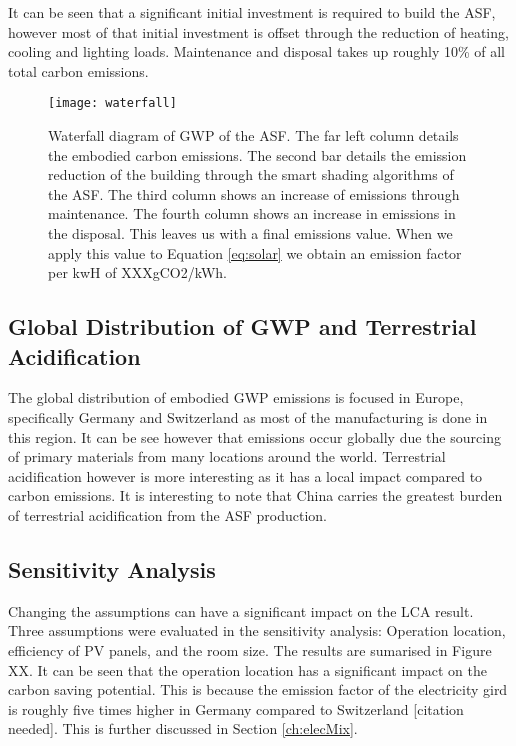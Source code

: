 It can be seen that a significant initial investment is required to build the ASF, however most of that initial investment is offset through the reduction of heating, cooling and lighting loads. Maintenance and disposal takes up roughly 10\% of all total carbon emissions.


\begin{figure}[H]
\begin{center}
\texttt{[image: waterfall]}
\caption{Waterfall diagram of GWP of the ASF. The far left column details the embodied carbon emissions. The second bar details the emission reduction of the building through the smart shading algorithms of the ASF. The third column shows an increase of emissions through maintenance. The fourth column shows an increase in emissions in the disposal. This leaves us with a final emissions value. When we apply this value to Equation \ref{eq:solar} we obtain an emission factor per kwH of XXXgCO2/kWh.}
\label{fig:waterfall}
\end{center}
\end{figure}

\subsection{Global Distribution of GWP and Terrestrial Acidification}

The global distribution of embodied GWP emissions is focused in Europe, specifically Germany and Switzerland as most of the manufacturing is done in this region. It can be see however that emissions occur globally due the sourcing of primary materials from many locations around the world. Terrestrial acidification however is more interesting as it has a local impact compared to carbon emissions. It is interesting to note that China carries the greatest burden of terrestrial acidification from the ASF production. 

\subsection{Sensitivity Analysis}

Changing the assumptions can have a significant impact on the LCA result. Three assumptions were evaluated in the sensitivity analysis: Operation location, efficiency of PV panels, and the room size. The results are sumarised in Figure XX. It can be seen that the operation location has a significant impact on the carbon saving potential. This is because the emission factor of the electricity gird is roughly five times higher in Germany compared to Switzerland [citation needed]. This is further discussed in Section \ref{ch:elecMix}.

